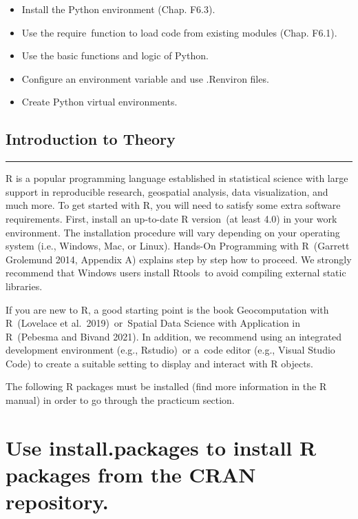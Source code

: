 \documentclass[
  letterpaper,
  DIV=11,
  numbers=noendperiod]{scrreprt}
\providecommand{\tightlist}{%
  \setlength{\itemsep}{0pt}\setlength{\parskip}{0pt}}\usepackage{longtable,booktabs,array}
\begin{document}

\begin{itemize}
\tightlist
\item
  Install the Python environment (Chap. F6.3).
\item
  Use the require~function to load code from existing modules (Chap.
  F6.1).
\item
  Use the basic functions and logic of Python.
\item
  Configure an environment variable and use .Renviron files.
\item
  Create Python virtual environments.
\end{itemize}

\hypertarget{introduction-to-theory-18}{%
\section*{Introduction to Theory}\label{introduction-to-theory-18}}


\begin{center}\rule{0.5\linewidth}{0.5pt}\end{center}

R is a popular programming language established in statistical science
with large support in reproducible research, geospatial analysis, data
visualization, and much more. To get started with R, you will need to
satisfy some extra software requirements. First, install an up-to-date R
version~(at least 4.0) in your work environment. The installation
procedure will vary depending on your operating system (i.e., Windows,
Mac, or Linux). Hands-On Programming with R~(Garrett Grolemund 2014,
Appendix A) explains step by step how to proceed. We strongly recommend
that Windows users install Rtools~to avoid compiling external static
libraries.

If you are new to R, a good starting point is the book Geocomputation
with R~(Lovelace et al.~2019)~or~Spatial Data Science with Application
in R~(Pebesma and Bivand 2021). In addition, we recommend using an
integrated development environment (e.g., Rstudio)~or a~code editor
(e.g., Visual Studio Code) to create a suitable setting to display and
interact with R objects.

The following R packages must be installed (find more information in the
R manual) in order to go through the practicum section.

\hypertarget{use-install.packages-to-install-r-packages-from-the-cran-repository.}{%
\chapter{Use install.packages to install R packages from the CRAN
repository.}\label{use-install.packages-to-install-r-packages-from-the-cran-repository.}}
\end{document}
